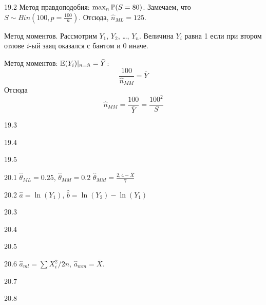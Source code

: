 \protect \hypertarget {soln:19.2}{}
\begin{solution}{{19.2}}
Метод правдоподобия: $\max_n \P(S=80)$. Замечаем, что $S \sim Bin\left(100, p=\frac{100}{n}\right)$. Отсюда, $\hat n_{ML} = 125$.

Метод моментов. Рассмотрим $Y_1$, $Y_2$, \ldots, $Y_n$. Величина $Y_i$ равна 1 если при втором отлове $i$-ый заяц оказался с бантом и 0 иначе.

Метод моментов: $\E(Y_i)|_{n=\hat n}=\bar Y$:
\[
\frac{100}{\hat n_{MM}}=\bar Y
\]
Отсюда
\[
\hat n_{MM} = \frac{100}{\bar Y} = \frac{100^2}{S}
\]
\end{solution}
\protect \hypertarget {soln:19.3}{}
\begin{solution}{{19.3}}
\end{solution}
\protect \hypertarget {soln:19.4}{}
\begin{solution}{{19.4}}
\end{solution}
\protect \hypertarget {soln:19.5}{}
\begin{solution}{{19.5}}
\end{solution}
\protect \hypertarget {soln:20.1}{}
\begin{solution}{{20.1}}
  $\hat{\theta}_{ML}=0.25$, $\hat{\theta}_{MM}=0.2$
  $\hat{\theta}_{MM}=\frac{2{,}4-\bar{X}}{7}$
\end{solution}
\protect \hypertarget {soln:20.2}{}
\begin{solution}{{20.2}}
$\hat{a}=\ln(Y_{1})$, $\hat{b}=\ln(Y_{2})-\ln(Y_{1})$
\end{solution}
\protect \hypertarget {soln:20.3}{}
\begin{solution}{{20.3}}
\end{solution}
\protect \hypertarget {soln:20.4}{}
\begin{solution}{{20.4}}
\end{solution}
\protect \hypertarget {soln:20.5}{}
\begin{solution}{{20.5}}
\end{solution}
\protect \hypertarget {soln:20.6}{}
\begin{solution}{{20.6}}
$\hat{a}_{ml}=\sum X_i^2/2n$, $\hat{a}_{mm}=\bar{X}$.
\end{solution}
\protect \hypertarget {soln:20.7}{}
\begin{solution}{{20.7}}
\end{solution}
\protect \hypertarget {soln:20.8}{}
\begin{solution}{{20.8}}
\end{solution}
\protect \hypertarget {soln:20.9}{}
